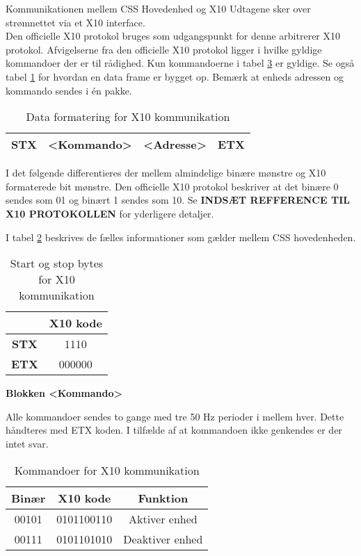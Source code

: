 Kommunikationen mellem CSS Hovedenhed og X10 Udtagene sker over strømnettet via et X10 interface.\\

Den officielle X10 protokol bruges som udgangspunkt for denne arbitrerer X10 protokol.
Afvigelserne fra den officielle X10 protokol ligger i hvilke gyldige kommandoer der er til rådighed. Kun kommandoerne i tabel \ref{tabel:X10Kommandoer} er gyldige. Se også tabel \ref{table:X10DataFormat} for hvordan en data frame er bygget op. Bemærk at   enheds adressen og kommando sendes i én pakke.

\begin{table}[h]
	\caption{Data formatering for X10 kommunikation}
	\centering
	\begin{tabular}{|c|c|c|c|}
		\hline 
		STX & <Kommando> & <Adresse> & ETX \\
		\hline 
	\end{tabular} 
	\label{table:X10DataFormat}
\end{table}

I det følgende differentieres der mellem almindelige binære mønstre og X10 formaterede bit mønstre.
Den officielle X10 protokol beskriver at det binære 0 sendes som 01 og binært 1 sendes som 10. Se \textbf{INDSÆT REFFERENCE TIL X10 PROTOKOLLEN} for yderligere detaljer.

I tabel \ref{table:X10StartStopBytes} beskrives de fælles informationer som gælder mellem CSS hovedenheden.

\begin{table}[h]
	\caption{Start og stop bytes for X10 kommunikation}
	\centering
	\begin{tabular}{|c|c|}
		\hline 
		& \textbf{X10 kode} \\ 
		\hline 
		\textbf{STX} & 1110\\ 
		\hline 
		\textbf{ETX} & 000000 \\ 
		\hline 
	\end{tabular} 
	\label{table:X10StartStopBytes}
\end{table}

\textbf{Blokken <Kommando>}

Alle kommandoer sendes to gange med tre 50 Hz perioder i mellem hver. Dette håndteres med ETX koden.
I tilfælde af at kommandoen ikke genkendes er der intet svar.

\begin{table}[h]
\caption{Kommandoer for X10 kommunikation}
\centering
\begin{tabular}{|c|c|c|}
\hline 
\textbf{Binær} & \textbf{X10 kode} & \textbf{Funktion} \\ 
\hline 
00101 & 0101100110 & Aktiver enhed \\ 
\hline 
00111 & 0101101010 & Deaktiver enhed \\ 
\hline
\end{tabular}
\label{tabel:X10Kommandoer}
\end{table} 

